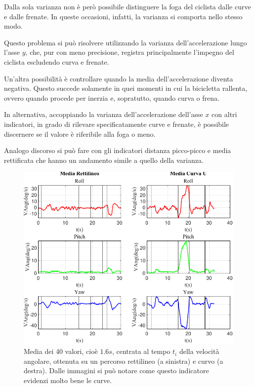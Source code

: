 \documentclass[class=article]{standalone}
\begin{document}
	Dalla sola varianza non è però possibile distinguere la foga del ciclista dalle curve e dalle frenate. In queste occasioni, infatti, la varianza si comporta nello stesso modo.
	
	Questo problema si può risolvere utilizzando la varianza dell'accelerazione lungo l'asse \(y\), che, pur con meno precisione, registra principalmente l'impegno del ciclista escludendo curva e frenate.
	
	Un'altra possibilità è controllare quando la media dell'accelerazione diventa negativa. Questo succede solamente in quei momenti in cui la bicicletta rallenta, ovvero quando procede per inerzia e, sopratutto, quando curva o frena.	
	
	In alternativa, accoppiando la varianza dell'accelerazione dell'asse \(x\) con altri indicatori, in grado di rilevare specificatamente curve e frenate, è possibile discernere se il valore è riferibile alla foga o meno.
	
	Analogo discorso si può fare con gli indicatori distanza picco-picco e media rettificata che hanno un andamento simile a quello della varianza.\hfill\break
	
	\begin{center}
		\begin{figure}[h!]
			\centering\includegraphics[width=.7\textwidth]{img/LungaCurvaU/VAng/Media}
			\caption[]{Media dei 40 valori, cioè \(1.6s\), centrata al tempo \(t_{i}\) della velocità angolare, ottenuta su un percorso rettilineo (a sinistra) e curvo (a destra). Dalle immagini si può notare come questo indicatore evidenzi molto bene le curve.}
			\label{fig:VAngMedia_LungaCurvaU}
		\end{figure}
	\end{center}
	
\end{document}
